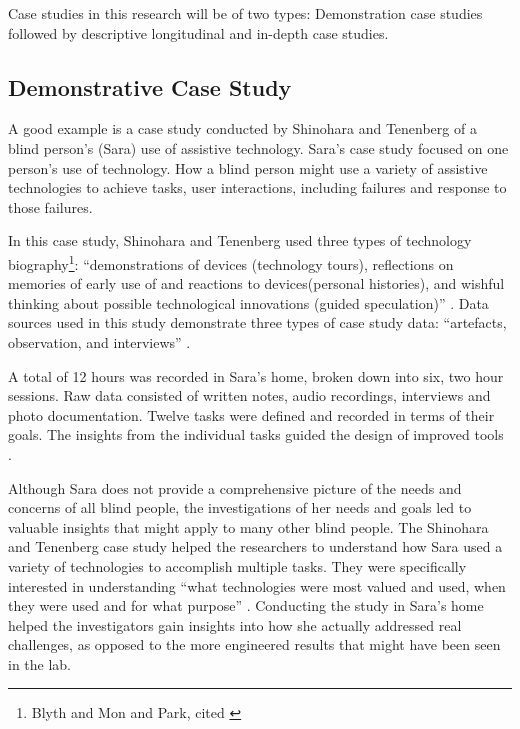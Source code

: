 Case studies in this research will be of two types: Demonstration case studies followed by descriptive longitudinal and in-depth case studies.

\subsection{Demonstrative Case Study}

A good example is a case study conducted by Shinohara and Tenenberg \parencite{Shinohara2009} of a blind person’s (Sara) use of assistive technology. Sara’s case study focused on one person’s use of technology. How a blind person might use a variety of assistive technologies to achieve tasks, user interactions, including failures and response to those failures.

In this case study, Shinohara and Tenenberg \parencite{Shinohara2009} used three types of technology biography\footnote{Blyth and Mon and Park, cited \parencite{Cox2008}}: ``demonstrations of devices (technology tours), reflections on memories of early use of and reactions to devices(personal histories), and wishful thinking about possible technological innovations (guided speculation)'' \parencite{Shinohara2009}. Data sources used in this study demonstrate three types of case study data: ``artefacts, observation, and interviews'' \parencite{Shinohara2009}.

A total of 12 hours was recorded in Sara’s home, broken down into six, two hour sessions.  Raw data consisted of written notes, audio recordings, interviews and photo documentation.  Twelve tasks were defined and recorded in terms of their goals.  The insights from the individual tasks guided the design of improved tools \parencite{Shinohara2009}.

Although Sara does not provide a comprehensive picture of the needs and concerns of all blind people, the investigations of her needs and goals led to valuable insights that might apply to many other blind people.  The Shinohara and Tenenberg \parencite{Shinohara2009} case study helped the researchers to understand how Sara used a variety of technologies to accomplish multiple tasks.  They were specifically interested in understanding ``what technologies were most valued and used, when they were used and for what purpose'' \parencite{Shinohara2009}. Conducting the study in Sara’s home helped the investigators gain insights into how she actually addressed real challenges, as opposed to the more engineered results that might have been seen in the lab.

